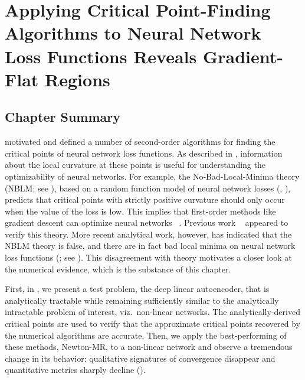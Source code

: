\documentclass[../../thesis.tex]{subfiles}
\begin{document}
\chapter{Applying Critical Point-Finding Algorithms to Neural Network Loss Functions
Reveals Gradient-Flat Regions}

\onlyinsubfile{\begin{KeepFromToc}
		\tableofcontents
		\listoffigures
	\end{KeepFromToc}}
\onlyinsubfile{\clearpage}
\onlyinsubfile{\linenumbers}

\section{Chapter Summary}%

 motivated and defined
a number of second-order algorithms
for finding the critical points of neural network loss functions.
As described in ,
information about the local curvature at these points is useful
for understanding the optimizability of neural networks.
For example, the No-Bad-Local-Minima theory
(NBLM\@; see ),
based on a random function model of neural network losses
(, ),
predicts that critical points with strictly positive curvature
should only occur when the value of the loss is low.
This implies that first-order methods like gradient descent
can optimize neural networks%
~\cite{jin2018a}.
Previous work%
~\cite{dauphin2014,pennington2017}
appeared to verify this theory.
More recent analytical work, however,
has indicated that the NBLM theory is false,
and there are in fact bad local minima
on neural network loss functions
(\cite{ding2019}; see ).
This disagreement with theory
motivates a closer look at the numerical evidence,
which is the substance of this chapter.

First, in ,
we present a test problem,
the deep linear autoencoder,
that is analytically tractable
while remaining sufficiently similar
to the analytically intractable problem
of interest, viz.~non-linear networks.
The analytically-derived critical points
are used to verify that the approximate critical points
recovered by the numerical algorithms are accurate.
Then, we apply the best-performing of these methods,
Newton-MR, to a non-linear network
and observe a tremendous change in its behavior:
qualitative signatures of convergence disappear
and quantitative metrics sharply decline
().
\end{document}
